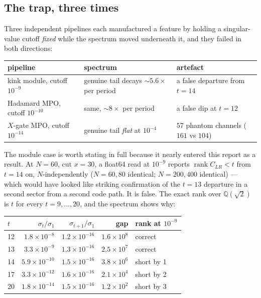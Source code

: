 \documentclass[11pt]{article}
\theoremstyle{plain}
\theoremstyle{remark}
\begin{document}
\subsection{The trap, three times}

Three independent pipelines each manufactured a feature by holding a
singular-value cutoff \emph{fixed} while the spectrum moved underneath it, and
they failed in both directions:

\begin{center}
\begin{tabular}{p{}p{}p{}}
\toprule
pipeline & spectrum & artefact \\
\midrule
kink module, cutoff $10^{-9}$ & genuine tail decays $\sim5.6\times$ per period
  & a false departure from $t=14$ \\
Hadamard MPO, cutoff $10^{-10}$ & same, $\sim8\times$ per period
  & a false dip at $t=12$ \\
$X$-gate MPO, cutoff $10^{-14}$ & genuine tail \emph{flat} at $10^{-4}$
  & $57$ phantom channels ($161$ vs $104$) \\
\bottomrule
\end{tabular}
\end{center}

\noindent The module case is worth stating in full because it nearly entered
this report as a result. At $N=60$, cut $x=30$, a float64 read at $10^{-9}$
reports $\operatorname{rank}C_{LR}<t$ from $t=14$ on, $N$-independently
($N=60,80$ identical; $N=200,400$ identical) --- which would have looked like
striking confirmation of the $t=13$ departure in a second sector from a second
code path. It is false. The exact rank over $\mathbb Q(\sqrt2)$ is $t$ for every
$t=9,\dots,20$, and the spectrum shows why:

\begin{center}
\begin{tabular}{lrrrl}
\toprule
$t$ & $\sigma_t/\sigma_1$ & $\sigma_{t+1}/\sigma_1$ & gap & rank at $10^{-9}$ \\
\midrule
12 & $1.8\times10^{-8}$ & $1.2\times10^{-16}$ & $1.6\times10^{8}$ & correct \\
13 & $3.3\times10^{-9}$ & $1.3\times10^{-16}$ & $2.5\times10^{7}$ & correct \\
14 & $5.9\times10^{-10}$ & $1.5\times10^{-16}$ & $3.8\times10^{6}$ & short by 1 \\
17 & $3.3\times10^{-12}$ & $1.6\times10^{-16}$ & $2.1\times10^{4}$ & short by 2 \\
20 & $1.8\times10^{-14}$ & $1.5\times10^{-16}$ & $1.2\times10^{2}$ & short by 3 \\
\bottomrule
\end{tabular}
\end{center}
\end{document}
